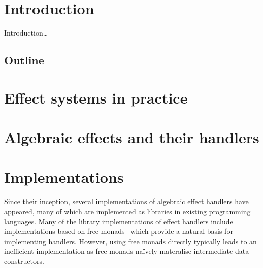\documentclass[preprint,9pt,numbers]{sigplanconf}
\title{\thetitle{}}
\begin{document}
\makeatletter
\def\@copyrightspace{\relax}
\makeatother

\preprintfooter{} %

\setlength{\pdfpageheight}{\paperheight}
\setlength{\pdfpagewidth}{\paperwidth}

\maketitle

\begin{abstract}
An abstract will appear here\dots
\end{abstract}

\section{Introduction}
Introduction\dots

\subsection{Outline}

\section{Effect systems in practice}

\section{Algebraic effects and their handlers}

\section{Implementations}
Since their inception, several implementations of algebraic effect
handlers have appeared, many of which are implemented as libraries in
existing programming languages.
%
%
Many of the library implementations of effect handlers include
implementations based on free monads~\cite{KammarLO13, KiselyovSS13,
  KiselyovI15, Brady13, WuSH14} which provide a natural basis for
implementing handlers. However, using free monads directly typically
leads to an inefficient implementation as free monads naïvely
materalise intermediate data constructors.
\end{document}

